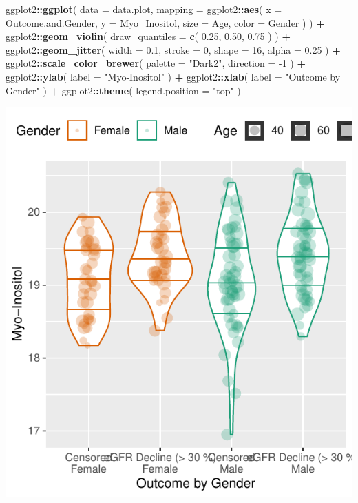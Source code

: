 \documentclass[]{article}
\newenvironment{Shaded}{\begin{snugshade}}{\end{snugshade}}
\newcommand{\DataTypeTok}[1]{\textcolor[rgb]{0.13,0.29,0.53}{#1}}
\newcommand{\DecValTok}[1]{\textcolor[rgb]{0.00,0.00,0.81}{#1}}
\newcommand{\FloatTok}[1]{\textcolor[rgb]{0.00,0.00,0.81}{#1}}
\newcommand{\KeywordTok}[1]{\textcolor[rgb]{0.13,0.29,0.53}{\textbf{#1}}}
\newcommand{\NormalTok}[1]{#1}
\newcommand{\OperatorTok}[1]{\textcolor[rgb]{0.81,0.36,0.00}{\textbf{#1}}}
\newcommand{\StringTok}[1]{\textcolor[rgb]{0.31,0.60,0.02}{#1}}
\begin{document}
\begin{Shaded}
\begin{Highlighting}[]
\NormalTok{ggplot2}\OperatorTok{::}\KeywordTok{ggplot}\NormalTok{(}
  \DataTypeTok{data =}\NormalTok{ data.plot,}
  \DataTypeTok{mapping =}\NormalTok{ ggplot2}\OperatorTok{::}\KeywordTok{aes}\NormalTok{(}
    \DataTypeTok{x =}\NormalTok{ Outcome.and.Gender, }
    \DataTypeTok{y =}\NormalTok{ Myo_Inositol,}
    \DataTypeTok{size =}\NormalTok{ Age, }
    \DataTypeTok{color =}\NormalTok{ Gender}
\NormalTok{  )}
\NormalTok{) }\OperatorTok{+}
\StringTok{  }\NormalTok{ggplot2}\OperatorTok{::}\KeywordTok{geom_violin}\NormalTok{( }\DataTypeTok{draw_quantiles =} \KeywordTok{c}\NormalTok{( }\FloatTok{0.25}\NormalTok{, }\FloatTok{0.50}\NormalTok{, }\FloatTok{0.75}\NormalTok{ ) ) }\OperatorTok{+}\StringTok{ }
\StringTok{  }\NormalTok{ggplot2}\OperatorTok{::}\KeywordTok{geom_jitter}\NormalTok{( }
    \DataTypeTok{width =} \FloatTok{0.1}\NormalTok{,}
    \DataTypeTok{stroke =} \DecValTok{0}\NormalTok{,}
    \DataTypeTok{shape =} \DecValTok{16}\NormalTok{,}
    \DataTypeTok{alpha =} \FloatTok{0.25}
\NormalTok{  ) }\OperatorTok{+}
\StringTok{  }\NormalTok{ggplot2}\OperatorTok{::}\KeywordTok{scale_color_brewer}\NormalTok{( }\DataTypeTok{palette =} \StringTok{"Dark2"}\NormalTok{, }\DataTypeTok{direction =} \DecValTok{-1}\NormalTok{ ) }\OperatorTok{+}
\StringTok{  }\NormalTok{ggplot2}\OperatorTok{::}\KeywordTok{ylab}\NormalTok{( }\DataTypeTok{label =} \StringTok{"Myo-Inositol"}\NormalTok{ ) }\OperatorTok{+}
\StringTok{  }\NormalTok{ggplot2}\OperatorTok{::}\KeywordTok{xlab}\NormalTok{( }\DataTypeTok{label =} \StringTok{"Outcome by Gender"}\NormalTok{ ) }\OperatorTok{+}
\StringTok{  }\NormalTok{ggplot2}\OperatorTok{::}\KeywordTok{theme}\NormalTok{( }\DataTypeTok{legend.position =} \StringTok{"top"}\NormalTok{ )}
\end{Highlighting}
\end{Shaded}

\includegraphics{0033_PROFIL--Metabolomics_files/figure-latex/Boxplots-Myo-I-2.pdf}
\end{document}
